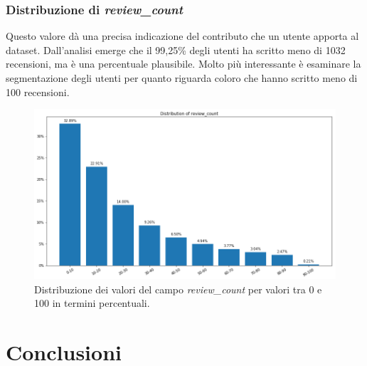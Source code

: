\documentclass[12pt]{article}
\begin{document}
\subsubsection{Distribuzione di \textit{review\_count}}
Questo valore dà una precisa indicazione del contributo che un utente apporta al dataset. Dall'analisi emerge che il 99,25\% degli utenti ha scritto meno di 1032 recensioni, ma è una percentuale plausibile. Molto più interessante è esaminare la segmentazione degli utenti per quanto riguarda coloro che hanno scritto meno di 100 recensioni.
\begin{figure}[h]
\centering
\includegraphics[width=\textwidth]{images/review_count_distribution.png}
\caption{Distribuzione dei valori del campo \textit{review\_count} per valori tra 0 e 100 in termini percentuali.}
\end{figure}

\section{Conclusioni}

\printbibliography[title={Riferimenti}]
\end{document}
